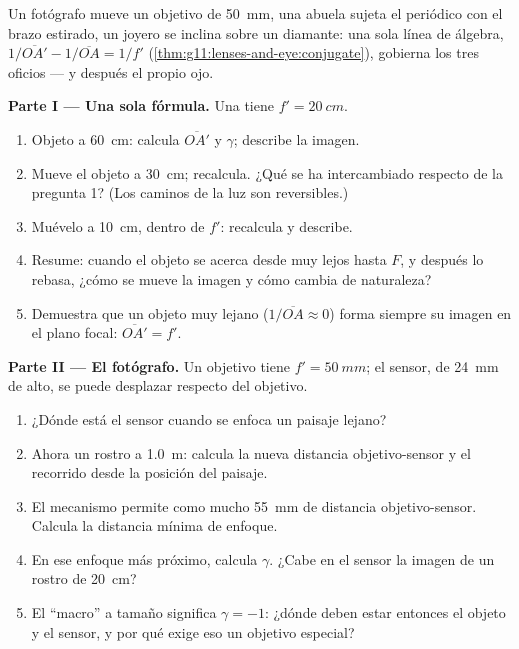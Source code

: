 \begin{problem}
\label{pb:g11:lenses-and-eye:1}
Un fotógrafo mueve un objetivo de \qty{50}{mm}, una abuela sujeta el
periódico con el brazo estirado, un joyero se inclina sobre un diamante:
una sola línea de álgebra,
$1/\overline{OA'} - 1/\overline{OA} = 1/f'$
(\cref{thm:g11:lenses-and-eye:conjugate}), gobierna los tres oficios ---
y después el propio ojo.

\medskip
\noindent\textbf{Parte I --- Una sola fórmula.} Una 
tiene $f' = \qty{20}{cm}$.
\begin{enumerate}
  \item Objeto a \qty{60}{cm}: calcula $\overline{OA'}$ y $\gamma$;
        describe la imagen.
  \item Mueve el objeto a \qty{30}{cm}; recalcula. ¿Qué se ha
        intercambiado respecto de la pregunta 1? (Los caminos de la luz
        son reversibles.)
  \item Muévelo a \qty{10}{cm}, dentro de $f'$: recalcula y describe.
  \item Resume: cuando el objeto se acerca desde muy lejos hasta $F$, y
        después lo rebasa, ¿cómo se mueve la imagen y cómo cambia de
        naturaleza?
  \item Demuestra que un objeto muy lejano
        ($1/\overline{OA} \approx 0$) forma siempre su imagen en el
        plano focal: $\overline{OA'} = f'$.
\end{enumerate}

\medskip
\noindent\textbf{Parte II --- El fotógrafo.}
Un objetivo tiene $f' = \qty{50}{mm}$; el sensor, de \qty{24}{mm} de
alto, se puede desplazar respecto del objetivo.
\begin{enumerate}[resume]
  \item ¿Dónde está el sensor cuando se enfoca un paisaje lejano?
  \item Ahora un rostro a \qty{1.0}{m}: calcula la nueva distancia
        objetivo-sensor y el recorrido desde la posición del paisaje.
  \item El mecanismo permite como mucho \qty{55}{mm} de distancia
        objetivo-sensor. Calcula la distancia mínima de enfoque.
  \item En ese enfoque más próximo, calcula $\gamma$. ¿Cabe en el sensor
        la imagen de un rostro de \qty{20}{cm}?
  \item El ``macro'' a tamaño  significa $\gamma = -1$: ¿dónde deben
        estar entonces el objeto y el sensor, y por qué exige eso un
        objetivo especial?
\end{enumerate}


\end{problem}

